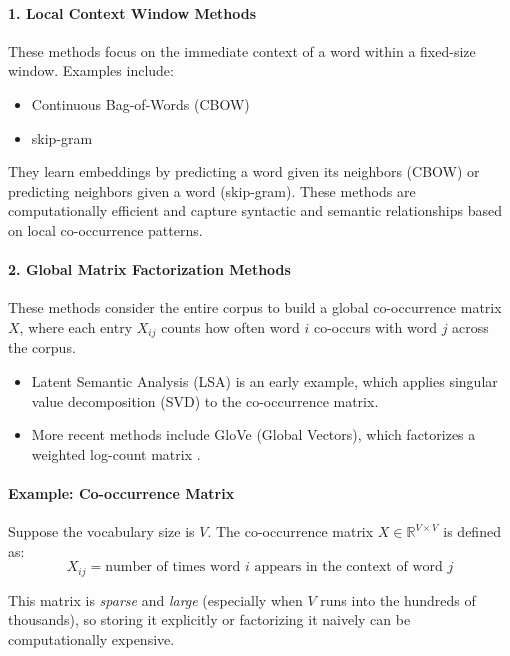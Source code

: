 \paragraph{1. Local Context Window Methods}

These methods focus on the immediate context of a word within a fixed-size window. Examples include:

\begin{itemize}
    \item Continuous Bag-of-Words (CBOW)
    \item skip-gram
\end{itemize}

They learn embeddings by predicting a word given its neighbors (CBOW) or predicting neighbors given a word (skip-gram). These methods are computationally efficient and capture syntactic and semantic relationships based on local co-occurrence patterns.

\paragraph{2. Global Matrix Factorization Methods}

These methods consider the entire corpus to build a global co-occurrence matrix \(X\), where each entry \(X_{ij}\) counts how often word \(i\) co-occurs with word \(j\) across the corpus.

\begin{itemize}
    \item Latent Semantic Analysis (LSA) is an early example, which applies singular value decomposition (SVD) to the co-occurrence matrix.
    \item More recent methods include GloVe (Global Vectors), which factorizes a weighted log-count matrix \citep{Pennington2014}.
\end{itemize}

\paragraph{Example: Co-occurrence Matrix}

Suppose the vocabulary size is \(V\). The co-occurrence matrix \(X \in \mathbb{R}^{V \times V}\) is defined as:
\[
X_{ij} = \text{number of times word } i \text{ appears in the context of word } j
\]

This matrix is \emph{sparse} and \emph{large} (especially when $V$ runs into the hundreds of thousands), so storing it explicitly or factorizing it naively can be computationally expensive.

